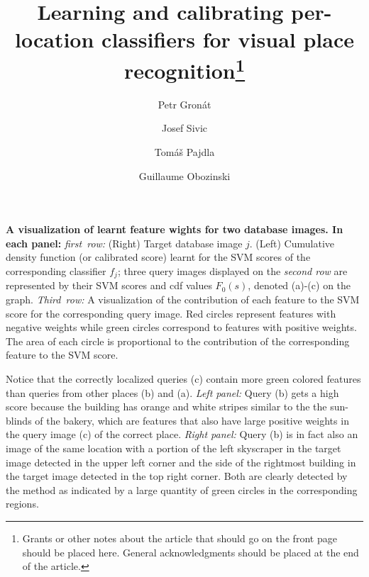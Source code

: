 {
   {\bf  A visualization of learnt feature wights for two database images. In each panel:} 
   \emph{first~row:} (Right) Target database image $j$. (Left) Cumulative density function (or calibrated score) learnt for the SVM scores of the corresponding classifier $f_j$;  three query images displayed on the \emph{second row} are represented by their SVM scores and cdf values $F_0(s)$, denoted (a)-(c) on the graph. \emph{Third~row:} A visualization of the contribution of each feature to the SVM score for the corresponding query image. Red circles represent features with negative weights while green circles correspond to features with positive weights. The area of each circle is proportional to the contribution of the corresponding feature to the SVM score.

   Notice that the correctly localized queries (c) contain more green colored features than queries from other places (b) and (a).
   {\it Left panel:}
   Query (b) gets a high score because the building has orange and white stripes similar to the the sun-blinds of the bakery, which are features that also have large positive weights in the query image (c) of the correct place.
   {\it Right panel:}
   Query (b) is in fact also an image of the same location with a portion of the left skyscraper in the target image detected in the upper left corner and the side of the rightmost building in the target image detected in the top right corner. Both are clearly detected by the method as indicated by a large quantity of green circles in the corresponding regions.
}
\newcommand{\diag}{\mathop{\mathrm{diag}}}

%
%


\title{Learning and calibrating per-location classifiers for visual place recognition\thanks{Grants or other notes
about the article that should go on the front page should be
placed here. General acknowledgments should be placed at the end of the article.}
}


\author{Petr Gron{\'a}t         \and
        Josef {S}ivic          \and
        Tom{\'a}{\v s} Pajdla   \and
        Guillaume Obozinski%
}



